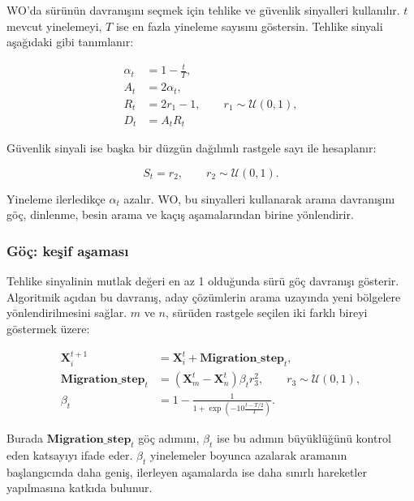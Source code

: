 WO'da sürünün davranışını seçmek için tehlike ve güvenlik sinyalleri
kullanılır. $t$ mevcut yinelemeyi, $T$ ise en fazla yineleme sayısını
göstersin. Tehlike sinyali aşağıdaki gibi tanımlanır:

\begin{align}
    \alpha_t &= 1-\frac{t}{T}, \label{eq:wo_alpha}\\
    A_t &= 2\alpha_t, \label{eq:wo_A}\\
    R_t &= 2r_1-1, \qquad r_1\sim\mathcal{U}(0,1), \label{eq:wo_R}\\
    D_t &= A_tR_t \label{eq:wo_danger}
\end{align}

Güvenlik sinyali ise başka bir düzgün dağılımlı rastgele sayı ile
hesaplanır:

\begin{equation}
    S_t=r_2,
    \qquad
    r_2\sim\mathcal{U}(0,1).
    \label{eq:wo_safety}
\end{equation}

Yineleme ilerledikçe $\alpha_t$ azalır. WO, bu sinyalleri kullanarak
arama davranışını göç, dinlenme, besin arama ve kaçış aşamalarından
birine yönlendirir.

\subsubsection{Göç: keşif aşaması}

Tehlike sinyalinin mutlak değeri en az 1 olduğunda sürü göç davranışı
gösterir. Algoritmik açıdan bu davranış, aday çözümlerin arama
uzayında yeni bölgelere yönlendirilmesini sağlar. $m$ ve $n$, sürüden
rastgele seçilen iki farklı bireyi göstermek üzere:

\begin{align}
    \mathbf{X}_i^{t+1}
    &=
    \mathbf{X}_i^t+\mathbf{Migration\_step}_t,
    \label{eq:wo_migration}\\
    \mathbf{Migration\_step}_t
    &=
    \left(\mathbf{X}_m^t-\mathbf{X}_n^t\right)
    \beta_t r_3^2,
    \qquad r_3\sim\mathcal{U}(0,1),
    \label{eq:wo_migration_step}\\
    \beta_t
    &=
    1-
    \frac{1}{
        1+\exp\left(
            -10\frac{t-T/2}{T}
        \right)
    }.
    \label{eq:wo_beta}
\end{align}

Burada $\mathbf{Migration\_step}_t$ göç adımını, $\beta_t$ ise bu adımın büyüklüğünü
kontrol eden katsayıyı ifade eder. $\beta_t$ yinelemeler boyunca
azalarak aramanın başlangıcında daha geniş, ilerleyen aşamalarda ise
daha sınırlı hareketler yapılmasına katkıda bulunur.

